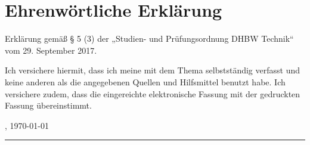 \section*{Ehrenwörtliche Erklärung}

Erklärung gemäß § 5 (3) der „Studien- und Prüfungsordnung DHBW Technik“
vom 29. September 2017.

Ich versichere hiermit, dass ich meine \art\/ mit dem Thema
    {\itshape{} \titel\/}
selbstständig verfasst und keine anderen als die angegebenen Quellen und Hilfsmittel benutzt habe.
Ich versichere zudem, dass die eingereichte elektronische Fassung mit der gedruckten Fassung übereinstimmt.


\vspace{3em}

\abgabeort, \today
\vspace{4em}

\rule{6cm}{0.4pt}\\
\autor

